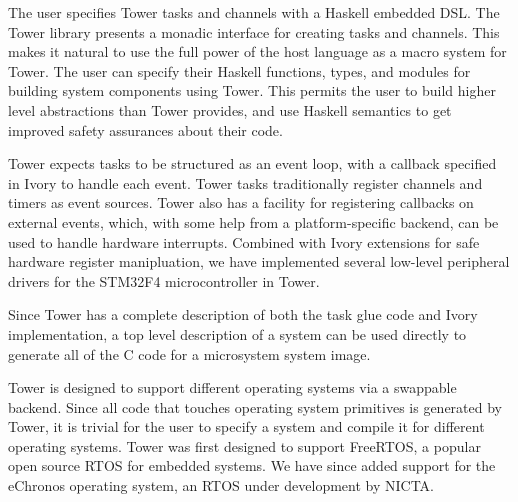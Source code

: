 The user specifies Tower tasks and channels with a Haskell embedded DSL. The
Tower library presents a monadic interface for creating tasks and channels.
This makes it natural to use the full power of the host language as a macro
system for Tower. The user can specify their Haskell functions, types, and
modules for building system components using Tower. This permits the user to
build higher level abstractions than Tower provides, and use Haskell semantics
to get improved safety assurances about their code.

Tower expects tasks to be structured as an event loop, with a callback specified
in Ivory to handle each event. Tower tasks traditionally register channels and
timers as event sources. Tower also has a facility for registering callbacks on
external events, which, with some help from a platform-specific backend, can
be used to handle hardware interrupts. Combined with Ivory extensions for safe
hardware register manipluation, we have implemented several low-level peripheral
drivers for the STM32F4 microcontroller in Tower.

Since Tower has a complete description of both the task glue code and Ivory
implementation, a top level description of a system can be used directly to
generate all of the C code for a microsystem system image.

Tower is designed to support different operating systems via a swappable
backend. Since all code that touches operating system primitives is generated by
Tower, it is trivial for the user to specify a system and compile it for
different operating systems. Tower was first designed to support FreeRTOS, a
popular open source RTOS for embedded systems. We have since added support for
the eChronos operating system, an RTOS under development by NICTA.


